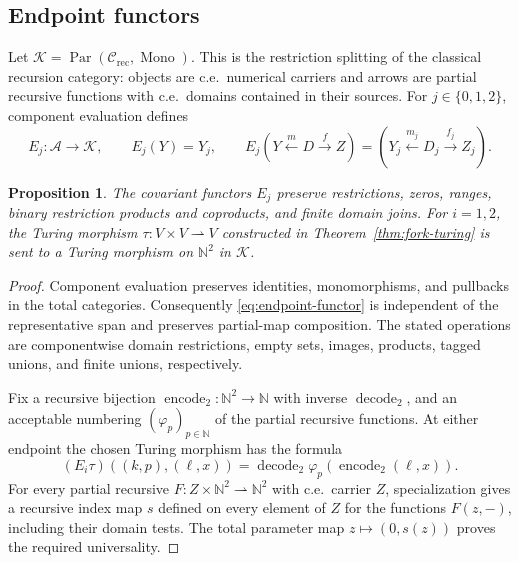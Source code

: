 \documentclass[11pt]{article}
\newtheorem{proposition}[theorem]{Proposition}
\newcommand{\N}{\mathbb N}
\begin{document}
\subsection{Endpoint functors}

Let
$\mathcal K=\operatorname{Par}(\mathcal C_{\mathrm{rec}},\operatorname{Mono})$.
This is the restriction splitting of the classical recursion category:
objects are c.e.\ numerical carriers and arrows are partial recursive
functions with c.e.\ domains contained in their sources.
For $j\in\{0,1,2\}$, component evaluation defines
\begin{equation}\label{eq:endpoint-functor}
 E_j:\mathcal A\longrightarrow\mathcal K,\qquad
 E_j(Y)=Y_j,\qquad
 E_j(Y\xleftarrow{m}D\xrightarrow{f}Z)
   =(Y_j\xleftarrow{m_j}D_j\xrightarrow{f_j}Z_j).
\end{equation}

\begin{proposition}\label{prop:endpoint}
The covariant functors $E_j$ preserve restrictions, zeros, ranges,
binary restriction products and coproducts, and finite domain joins.
For $i=1,2$, the Turing morphism
$\tau:V\times V\rightharpoonup V$ constructed in
Theorem~\ref{thm:fork-turing} is sent
to a Turing morphism on $\N^2$ in $\mathcal K$.
\end{proposition}
\begin{proof}
Component evaluation preserves identities, monomorphisms, and
pullbacks in the total categories. Consequently \eqref{eq:endpoint-functor}
is independent of the representative span and preserves partial-map
composition. The stated operations are componentwise domain
restrictions, empty sets, images, products, tagged unions, and finite
unions, respectively.

Fix a recursive bijection $\operatorname{encode}_2:\N^2\to\N$
with inverse $\operatorname{decode}_2$, and an acceptable numbering
$(\varphi_p)_{p\in\N}$ of the partial recursive functions.
At either endpoint the chosen
Turing morphism has the formula
\[
 (E_i\tau)((k,p),(\ell,x))
 =\operatorname{decode}_2\varphi_p(\operatorname{encode}_2(\ell,x)).
\]
For every partial recursive
$F:Z\times\N^2\rightharpoonup\N^2$ with c.e.\ carrier $Z$,
specialization gives a recursive index map $s$ defined on every
element of $Z$ for
the functions $F(z,-)$, including their domain tests.
The total parameter map $z\mapsto(0,s(z))$ proves the required
universality.
\end{proof}
\end{document}
